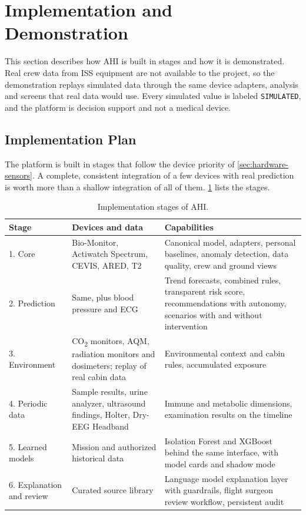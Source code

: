 \section{Implementation and Demonstration}
\label{sec:implementation-demo}

This section describes how AHI is built in stages and how it is demonstrated. Real crew data from ISS equipment are not available to the project, so the demonstration replays simulated data through the same device adapters, analysis and screens that real data would use. Every simulated value is labeled \texttt{SIMULATED}, and the platform is decision support and not a medical device.

\subsection{Implementation Plan}
\label{subsec:features}

The platform is built in stages that follow the device priority of \ref{sec:hardware-sensors}. A complete, consistent integration of a few devices with real prediction is worth more than a shallow integration of all of them. \ref{tab:features} lists the stages.

\begin{table}[htbp]
\centering
\vspace{0.8em}
\caption{Implementation stages of AHI.}
\label{tab:features}
\footnotesize
\begin{tabular}{p{2.6cm}p{5.6cm}p{5.8cm}}
\hline
\textbf{Stage} & \textbf{Devices and data} & \textbf{Capabilities} \\
\hline
1. Core & Bio-Monitor, Actiwatch Spectrum, CEVIS, ARED, T2 & Canonical model, adapters, personal baselines, anomaly detection, data quality, crew and ground views \\
2. Prediction & Same, plus blood pressure and ECG & Trend forecasts, combined rules, transparent risk score, recommendations with autonomy, scenarios with and without intervention \\
3. Environment & CO\textsubscript{2} monitors, AQM, radiation monitors and dosimeters; replay of real cabin data & Environmental context and cabin rules, accumulated exposure \\
4. Periodic data & Sample results, urine analyzer, ultrasound findings, Holter, Dry-EEG Headband & Immune and metabolic dimensions, examination results on the timeline \\
5. Learned models & Mission and authorized historical data & Isolation Forest and XGBoost behind the same interface, with model cards and shadow mode \\
6. Explanation and review & Curated source library & Language model explanation layer with guardrails, flight surgeon review workflow, persistent audit \\
\hline
\end{tabular}
\vspace{1.2em}
\end{table}

